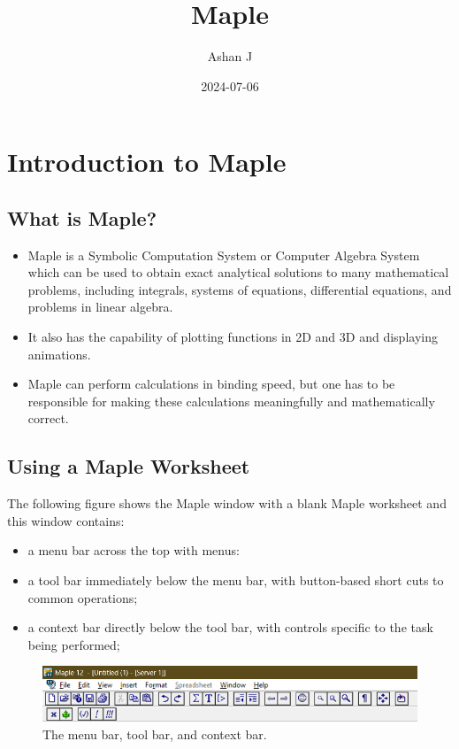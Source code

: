 \documentclass[
]{book}
\title{Maple}
\author{Ashan J}
\date{2024-07-06}
\providecommand{\tightlist}{%
  \setlength{\itemsep}{0pt}\setlength{\parskip}{0pt}}
\theoremstyle{definition}
\theoremstyle{definition}
\theoremstyle{definition}
\theoremstyle{definition}
\theoremstyle{remark}
\begin{document}
\maketitle

{
\setcounter{tocdepth}{1}
\tableofcontents
}
\chapter{Introduction to Maple}\label{introduction-to-maple}

\section{What is Maple?}\label{what-is-maple}

\begin{itemize}
\tightlist
\item
  Maple is a Symbolic Computation System or Computer Algebra System which can be used to obtain exact analytical solutions to many mathematical problems, including integrals, systems of equations, differential equations, and problems in linear algebra.
\item
  It also has the capability of plotting functions in 2D and 3D and displaying animations.
\item
  Maple can perform calculations in binding speed, but one has to be responsible for making these calculations meaningfully and mathematically correct.
\end{itemize}

\section{Using a Maple Worksheet}\label{using-a-maple-worksheet}

The following figure shows the Maple window with a blank Maple worksheet and this window contains:

\begin{itemize}
\tightlist
\item
  a menu bar across the top with menus:
\item
  a tool bar immediately below the menu bar, with button-based short cuts to common operations;
\item
  a context bar directly below the tool bar, with controls specific to the task being performed;
\end{itemize}

\begin{figure}
\centering
\includegraphics{figures/Lesson 1/fig1.png}
\caption{The menu bar, tool bar, and context bar.}
\end{figure}
\end{document}
